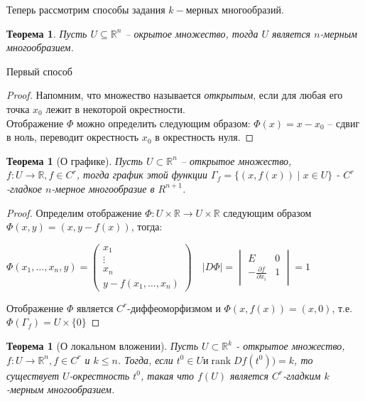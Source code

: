 \documentclass[a5paper]{article}
\newcounter{through}
\theoremstyle{plain}
\newtheorem{theorem}[through]{Теорема}
\theoremstyle{definition}
\numberwithin{through}{section}
\numberwithin{equation}{section}
\DeclareMathOperator{\rank}{rank}
\begin{document}
Теперь рассмотрим способы задания $k-$мерных многообразий.

\begin{theorem}%
	\label{OpenSetManifold}
	Пусть $U \subseteq \mathbb{R}^n$ -- окрытое множество, тогда $U$ является 
	$n$-мерным многообразием.
\end{theorem}

Первый способ 
\begin{proof}
	Напомним, что множество называется \textit{открытым}, если для любая его точка $x_0$ лежит в некоторой окрестности.\\
	Отображение $\Phi$ можно определить следующим образом:
	$\Phi(x)=x-x_0$ -- сдвиг в ноль, переводит окрестность $x_0$ в окрестность нуля.
\end{proof}

\begin{theorem}[О графике]
	Пусть $U \subset \mathbb{R}^n$ -- открытое множество, $f: U \to \mathbb{R}, f \in C^r$, тогда график этой функции $\Gamma_f = 
	\{ (x, f(x))  \mid x \in U \}$ - $C^r$-гладкое $n$-мерное многообразие в $R^{n+1}$.
\end{theorem}

\begin{proof}
	Определим отображение $\Phi : U \times \mathbb{R} \to U \times \mathbb{R}$ следующим образом $\Phi(x, y) = (x, y - f(x))$, тогда:
	
	$\Phi(x_1, \ldots, x_n, y) = 
	\begin{pmatrix}
	x_1 \\
	\vdots \\
	x_n \\
	y - f(x_1, \ldots, x_n)
	\end{pmatrix} \quad
	\left| D \Phi \right|=
	\begin{vmatrix}
	E& 0 \\
	-\frac{\partial f}{\partial x_i} & 1
	\end{vmatrix}
	= 1
	$
	
	Отображение $\Phi$ является $C^r$-диффеоморфизмом и $\Phi(x,f(x)) = (x, 0)$, т.е. $\Phi(\Gamma_f) = U \times \{0\}$
\end{proof}

\begin{theorem}[О локальном вложении]
	Пусть $U \subset \mathbb{R}^k$ - открытое множество, $f: U \to \mathbb{R}^n, f \in C^r$ и $k \leq n $. Тогда, если $t^0 \in U и \rank Df(t^0)) = k$, то существует $U$-окрестность $t^0$, такая что $f(U)$ является $C^r$-гладким $k$-мерным многообразием.
\end{theorem}
\end{document}
